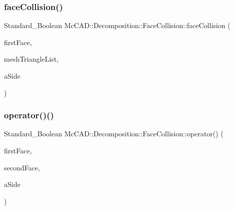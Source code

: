 \subsubsection{\texorpdfstring{face\+Collision()}{faceCollision()}\hspace{0.1cm}{\footnotesize\ttfamily [2/2]}}
{\footnotesize\ttfamily Standard\+\_\+\+Boolean Mc\+C\+A\+D\+::\+Decomposition\+::\+Face\+Collision\+::face\+Collision (\begin{DoxyParamCaption}\item[{const \hyperlink{classMcCAD_1_1Geometry_1_1BoundSurface}{Mc\+C\+A\+D\+::\+Geometry\+::\+Bound\+Surface} \&}]{first\+Face,  }\item[{const std\+::vector$<$ std\+::shared\+\_\+ptr$<$ \hyperlink{classMcCAD_1_1Geometry_1_1MeshTriangle}{Mc\+C\+A\+D\+::\+Geometry\+::\+Mesh\+Triangle} $>$$>$ \&}]{mesh\+Triangle\+List,  }\item[{Standard\+\_\+\+Integer \&}]{a\+Side }\end{DoxyParamCaption})\hspace{0.3cm}{\ttfamily [private]}}

\mbox{\label{classMcCAD_1_1Decomposition_1_1FaceCollision_a081f71aa83d64fca9a0d0483854f9e9d}} 
\subsubsection{\texorpdfstring{operator()()}{operator()()}\hspace{0.1cm}{\footnotesize\ttfamily [1/2]}}
{\footnotesize\ttfamily Standard\+\_\+\+Boolean Mc\+C\+A\+D\+::\+Decomposition\+::\+Face\+Collision\+::operator() (\begin{DoxyParamCaption}\item[{const \hyperlink{classMcCAD_1_1Geometry_1_1BoundSurface}{Mc\+C\+A\+D\+::\+Geometry\+::\+Bound\+Surface} \&}]{first\+Face,  }\item[{const \hyperlink{classMcCAD_1_1Geometry_1_1BoundSurface}{Mc\+C\+A\+D\+::\+Geometry\+::\+Bound\+Surface} \&}]{second\+Face,  }\item[{Standard\+\_\+\+Integer \&}]{a\+Side }\end{DoxyParamCaption})}

